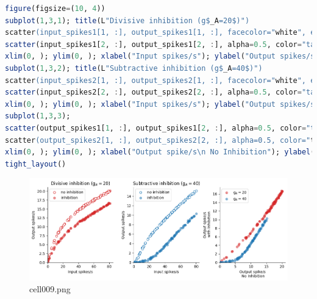 \begin{lstlisting}[language=julia]
figure(figsize=(10, 4))
subplot(1,3,1); title(L"Divisive inhibition (g$_A=20$)")
scatter(input_spikes1[1, :], output_spikes1[1, :], facecolor="white", edgecolors="tab:red", label="no inhibition")
scatter(input_spikes1[2, :], output_spikes1[2, :], alpha=0.5, color="tab:red", label="inhibition")
xlim(0, ); ylim(0, ); xlabel("Input spikes/s"); ylabel("Output spikes/s"); legend()
subplot(1,3,2); title(L"Subtractive inhibition (g$_A=40$)")
scatter(input_spikes2[1, :], output_spikes2[1, :], facecolor="white", edgecolors="tab:blue", label="no inhibition")
scatter(input_spikes2[2, :], output_spikes2[2, :], alpha=0.5, color="tab:blue", label="inhibition")
xlim(0, ); ylim(0, ); xlabel("Input spikes/s"); ylabel("Output spikes/s"); legend()
subplot(1,3,3);
scatter(output_spikes1[1, :], output_spikes1[2, :], alpha=0.5, color="tab:red", label=L"g$_A=20$")
scatter(output_spikes2[1, :], output_spikes2[2, :], alpha=0.5, color="tab:blue", label=L"g$_A=40$")
xlim(0, ); ylim(0, ); xlabel("Output spike/s\n No Inhibition"); ylabel("Output spike/s\n with Inhibition"); legend()
tight_layout()
\end{lstlisting}
\begin{figure}[ht]
	\centering
	\includegraphics[scale=0.8, max width=\linewidth]{./fig/neuronal-computation/neuronal-arithmetic/cell009.png}
	\caption{cell009.png}
	\label{cell009.png}
\end{figure}
